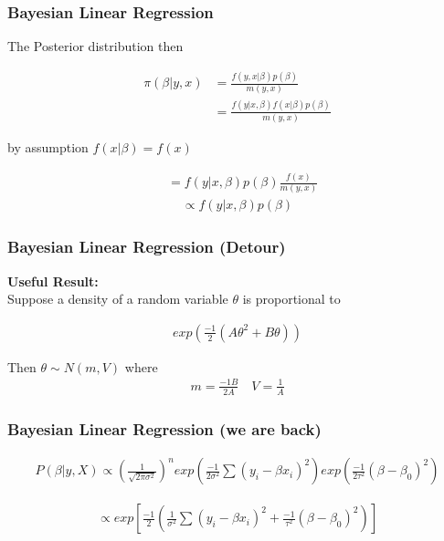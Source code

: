 \documentclass[
  shownotes,
  xcolor={svgnames},
  hyperref={colorlinks,citecolor=DarkBlue,linkcolor=DarkRed,urlcolor=DarkBlue}
  ]{beamer}
\begin{document}
\begin{frame}[fragile]
\frametitle{Bayesian Linear Regression}
The Posterior distribution then 

\begin{align}
\pi (\beta|y,x) &= \frac{f(y,x|\beta)p(\beta)}{m(y,x)} \\
&= \frac{f(y|x,\beta)f(x|\beta)p(\beta)}{m(y,x)}
\end{align}

by assumption $f(x|\beta)=f(x)$

\begin{align}
&= f(y|x,\beta)p(\beta)\frac{f(x)}{m(y,x)}
\end{align}
\begin{align}
\propto f(y|x,\beta)p(\beta)
\end{align}

\end{frame}
\begin{frame}[fragile]
\frametitle{Bayesian Linear Regression (Detour)}
{\bf Useful Result:} \\

\bigskip
Suppose a density of a random variable $\theta$ is proportional to

\begin{align}
  exp\left(\frac{-1}{2}(A\theta^2+B\theta)\right)
\end{align}

Then $\theta\sim N(m,V)$ where
\begin{align}
m=\frac{-1B}{2A} \,\,\,\,\,\, V=\frac{1}{A}
\end{align}


\end{frame}
\begin{frame}[fragile]
\frametitle{Bayesian Linear Regression (we are back)}


\begin{align}
P(\beta|y,X) \propto \left(\frac{1}{\sqrt{2\pi\sigma^2}}\right)^n exp\left(\frac{-1}{2\sigma^2}\sum(y_i-\beta x_i)^2\right)exp\left(\frac{-1}{2\tau^2}(\beta-\beta_0)^2\right)
\end{align}


\begin{align}
\propto  exp \left[ \frac{-1}{2} \left(\frac{1}{\sigma^2}\sum(y_i-\beta x_i)^2 + \frac{-1}{\tau^2}(\beta-\beta_0)^2\right)\right]
\end{align}

\end{frame}
\end{document}

